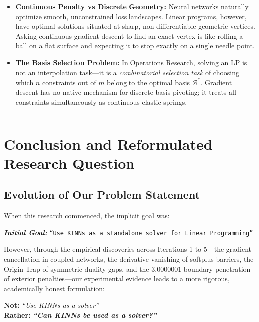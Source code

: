 \documentclass[11pt,a4paper]{article}
\begin{document}
\begin{itemize}[leftmargin=1.5em, itemsep=3pt]
    \item \textbf{Continuous Penalty vs Discrete Geometry:} Neural networks naturally optimize smooth, unconstrained loss landscapes. Linear programs, however, have optimal solutions situated at sharp, non-differentiable geometric vertices. Asking continuous gradient descent to find an exact vertex is like rolling a ball on a flat surface and expecting it to stop exactly on a single needle point.
    \item \textbf{The Basis Selection Problem:} In Operations Research, solving an LP is not an interpolation task---it is a \textit{combinatorial selection task} of choosing which $n$ constraints out of $m$ belong to the optimal basis $\mathcal{B}^*$. Gradient descent has no native mechanism for discrete basis pivoting; it treats all constraints simultaneously as continuous elastic springs.
\end{itemize}

\vspace{1em}
\hrule
\vspace{1.5em}

\section{Conclusion and Reformulated Research Question}

\subsection{Evolution of Our Problem Statement}
When this research commenced, the implicit goal was:
\begin{center}
    \textit{\textbf{Initial Goal:}} \quad \texttt{``Use KINNs as a standalone solver for Linear Programming''}
\end{center}

However, through the empirical discoveries across Iterations 1 to 5---the gradient cancellation in coupled networks, the derivative vanishing of softplus barriers, the Origin Trap of symmetric duality gaps, and the $3.0000001$ boundary penetration of exterior penalties---our experimental evidence leads to a more rigorous, academically honest formulation:

\begin{tcolorbox}[colback=primaryblue!5, colframe=primaryblue, title=\textbf{The Refined Research Question}, boxrule=1.2pt]
\centering\large
\textbf{Not:} \quad \textit{``Use KINNs as a solver''} \\[0.4em]
\textbf{Rather:} \quad \textit{\textbf{``Can KINNs be used as a solver?''}}
\end{tcolorbox}
\end{document}
